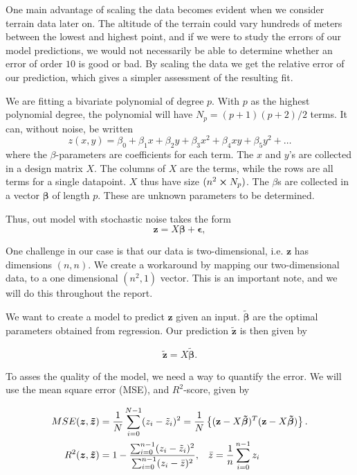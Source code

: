 \documentclass[reprint,english,notitlepage,aps,nobalancelastpage,nofootinbib]{revtex4-1}  %
\newcommand{\vc}[1]{\mathbf{#1}}
\begin{document}
One main advantage of scaling the data becomes evident when we consider terrain data later on. The altitude of the terrain could vary hundreds of meters between the lowest and highest point, and if we were to study the errors of our model predictions, we would not necessarily be able to determine whether an error of order $10$ is good or bad. By scaling the data we get the relative error of our prediction, which gives a simpler assessment of the resulting fit.

We are fitting a bivariate polynomial of degree $p$. With $p$ as the highest polynomial degree, the polynomial will have $N_p=(p+1)(p+2) / 2$ terms. It can, without noise, be written
\begin{equation}\label{eq:zpolynm}
	z(x, y) = \beta_0 + \beta_1x + \beta_2y + \beta_3x^2 + \beta_4xy + \beta_5y^2 + \dots
\end{equation}
where the $\beta$-parameters are coefficients for each term. The $x$ and $y$'s are collected in a design matrix $X$. The columns of $X$ are the terms, while the rows are all terms for a single datapoint. $X$ thus have size $(n^2\cross N_p)$. The $\beta$s are collected in a vector $\boldsymbol{\beta}$ of length $p$. These are unknown parameters to be determined.

Thus, out model with stochastic noise takes the form
\begin{equation}
	\label{eq:z_true_data}
	\vc{z} = X \boldsymbol{\beta} + \boldsymbol{\epsilon},
\end{equation}

One challenge in our case is that our data is two-dimensional, i.e. $\vc{z}$ has dimensions $(n,n)$. We create a workaround by mapping our two-dimensional data, to a one dimensional $(n^2,1)$ vector. This is an important note, and we will do this throughout the report.

We want to create a model to predict $\vc{z}$ given an input. $\boldsymbol{\tilde\beta}$ are the optimal parameters obtained from regression. Our prediction \(\boldsymbol{\tilde{\vc{z}}}\) is then given by

\begin{equation*}
	\boldsymbol{\tilde{z}} = X\boldsymbol{\tilde{\beta}}.
\end{equation*}

To asses the quality of the model, we need a way to quantify the error. We will use the mean square error (MSE), and $R^2$-score, given by

{\large
\begin{align*}
	MSE(\boldsymbol{z}, \boldsymbol{\tilde{z}}) &= \frac{1}{N}\sum_{i=0}^{N-1} (z_i - \tilde{z}_i)^2 = \frac{1}{N}\left\{(\vc{z} - X\boldsymbol{\tilde{\beta}})^T(\vc{z} - X\boldsymbol{\tilde{\beta}})\right\}.
	\\
	R^2(\boldsymbol{z}, \boldsymbol{\tilde{z}}) &= 1 - \frac{\sum_{i=0}^{n-1}(z_i - \tilde{z}_i)^2}{\sum_{i=0}^{n-1}(z_i - \bar{z})^2}, \hspace{3mm} \bar{z} = \frac{1}{n}\sum_{i=0}^{n-1}z_i
\end{align*}
}%
\end{document}
